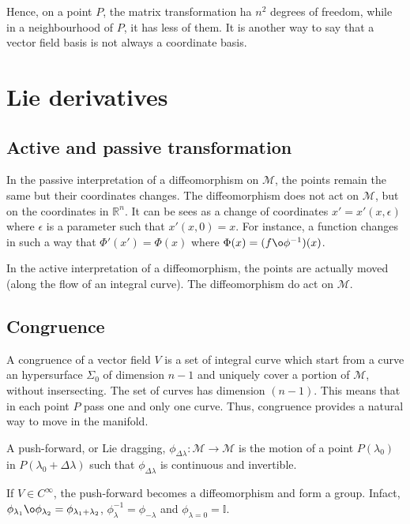     Hence, on a point $P$, the matrix transformation ha $n^2$ degrees of freedom, while in a neighbourhood of $P$, it has less of them. It is another way to say that a vector field basis is not always a coordinate basis.

\chapter{Lie derivatives}

\section{Active and passive transformation}

    In the passive interpretation of a diffeomorphism on $\mathcal M$, the points remain the same but their coordinates changes. The diffeomorphism does not act on $\mathcal M$, but on the coordinates in $\mathbb R^n$. It can be sees as a change of coordinates $x' = x'(x, \epsilon)$ where $\epsilon$ is a parameter such that $x'(x, 0) = x$. For instance, a function changes in such a way that $\Phi'(x') = \Phi(x)$ where $\Phi(x) = (f \o \phi^{-1})(x)$.

    In the active interpretation of a diffeomorphism, the points are actually moved (along the flow of an integral curve). The diffeomorphism do act on $\mathcal M$. 

\section{Congruence}

    A congruence of a vector field $V$ is a set of integral curve which start from a curve an hypersurface $\Sigma_0$ of dimension $n-1$ and uniquely cover a portion of $\mathcal M$, without insersecting. The set of curves has dimension $(n-1)$. This means that in each point $P$ pass one and only one curve. Thus, congruence provides a natural way to move in the manifold. 
    
    \begin{definition}
        A push-forward, or Lie dragging, $\phi_{\Delta \lambda} \colon \mathcal M \rightarrow \mathcal M$ is the motion of a point $P(\lambda_0)$ in $P(\lambda_0 + \Delta \lambda)$ such that $\phi_{\Delta \lambda}$ is continuous and invertible.
    \end{definition} 
    
    If $V \in C^{\infty}$, the push-forward becomes a diffeomorphism and form a group. Infact, $\phi_{\lambda_1} \o \phi_{\lambda_2} = \phi_{\lambda_1 + \lambda_2}$, $\phi_{\lambda}^{-1} = \phi_{- \lambda}$ and $\phi_{\lambda = 0} = \mathbb I$. 


